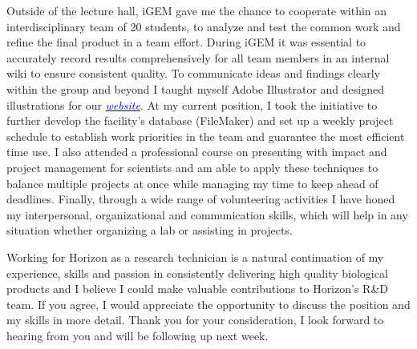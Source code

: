 \documentclass[11pt,a4paper,sans]{moderncv}
\begin{document}
\begin{spacing}{1.15}
Outside of the lecture hall, iGEM gave me the chance to cooperate within an interdisciplinary team of 20 students, to analyze and test the common work and refine the final product in a team effort. During iGEM it was essential to accurately record results comprehensively for all team members in an internal wiki to ensure consistent quality. To communicate ideas and findings clearly within the group and beyond I taught myself Adobe Illustrator and designed illustrations for our {\href{http://2015.igem.org/Team:Freiburg}{\textcolor{blue}{\textit{website}}}}. At my current position, I took the initiative to further develop the facility's database (FileMaker) and set up a weekly project schedule to establish work priorities in the team and guarantee the most efficient time use. I also attended a professional course on presenting with impact and project management for scientists and am able to apply these techniques to balance multiple projects at once while managing my time to keep ahead of deadlines. Finally, through a wide range of volunteering activities I have honed my interpersonal, organizational and communication skills, which will help in any situation whether organizing a lab or assisting in projects.\par\vspace*{2mm}

Working for Horizon as a research technician is a natural continuation of my experience, skills and passion in consistently delivering high quality biological products and I believe I could make valuable contributions to Horizon's R\&D team. If you agree, I would appreciate the opportunity to discuss the position and my skills in more detail. Thank you for your consideration, I look forward to hearing from you and will be following up next week.

\end{spacing}
\vspace*{2mm} 
\makeletterclosing
\end{document}
